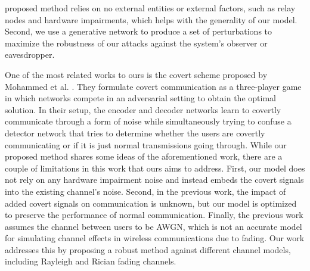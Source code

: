 proposed method relies on no external entities or external factors, such as relay nodes and hardware impairments, which helps with the generality of our model. Second, we use a generative network to produce a set of perturbations to maximize the robustness of our attacks against the system's observer or eavesdropper.

One of the most related works to ours is the covert scheme proposed by Mohammed et al. \cite{mohammed2021adversarial}. They formulate covert communication as a three-player game in which networks compete in an adversarial setting to obtain the optimal solution. In their setup, the encoder and decoder networks learn to covertly communicate through a form of noise while simultaneously trying to confuse a detector network that tries to determine whether the users are covertly communicating or if it is just normal transmissions going through. While our proposed method shares some ideas of the aforementioned work, there are a couple of limitations in this work that ours aims to address. First, our model does not rely on any hardware impairment noise and instead embeds the covert signals into the existing channel's noise. Second, in the previous work, the impact of added covert signals on communication is unknown, but our model is optimized to preserve the performance of normal communication. Finally, the previous work assumes the channel between users to be AWGN, which is not an accurate model for simulating channel effects in wireless communications due to fading. Our work addresses this by proposing a robust method against different channel models, including Rayleigh and Rician fading channels.